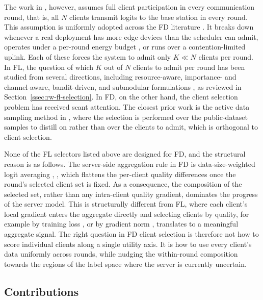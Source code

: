 \documentclass[journal]{IEEEtran}
\newcommand{\new}[1]{#1}
\newcommand{\rev}[1]{{\color{blue}#1}}
\begin{document}
The work in \cite{mu2024fedtskd}, however, assumes full client participation in every communication round, that is, all $N$ clients transmit logits to the base station in every round. This assumption is uniformly adopted across the FD literature \cite{itahara2023distillation, sattler2022cfd, sattler2023fedaux, wu2024fedict}. It breaks down whenever a real deployment has more edge devices than the scheduler can admit, operates under a per-round energy budget \rev{\cite{thakur2026grace}}, or runs over a contention-limited uplink. Each of these forces the system to admit only $K \ll N$ clients per round. \new{In FL, the question of which $K$ out of $N$ clients to admit per round has been studied from several directions, including resource-aware, importance- and channel-aware, bandit-driven, and submodular formulations \cite{nishio2019client, yang2020scheduling, ren2020scheduling, shi2020joint, xia2020mab, cho2020bandit, balakrishnan2022divfl}, as reviewed in Section~\ref{ssec:rw-fl-selection}.} In FD, on the other hand, the client selection problem has received scant attention. The closest prior work is the active data sampling method in \cite{liu2022active}, where the selection is performed over the public-dataset samples to distill on rather than over the clients to admit, which is orthogonal to client selection.

None of the FL selectors listed above are designed for FD, and the structural reason is as follows. The server-side aggregation rule in FD is data-size-weighted logit averaging \cite{mu2024fedtskd}, \cite{itahara2023distillation}, which flattens the per-client quality differences once the round's selected client set is fixed. As a consequence, the composition of the selected set, rather than any intra-client quality gradient, dominates the progress of the server model. This is structurally different from FL, where each client's local gradient enters the aggregate directly and selecting clients by quality, for example by training loss \cite{cho2020bandit}, \cite{xia2020mab} or by gradient norm \cite{wang2019adaptive}, translates to a meaningful aggregate signal. The right question in FD client selection is therefore not how to score individual clients along a single utility axis. It is how to use every client's data uniformly across rounds, while nudging the within-round composition towards the regions of the label space where the server is currently uncertain.

\subsection{Contributions}
\label{ssec:contributions}
\end{document}
